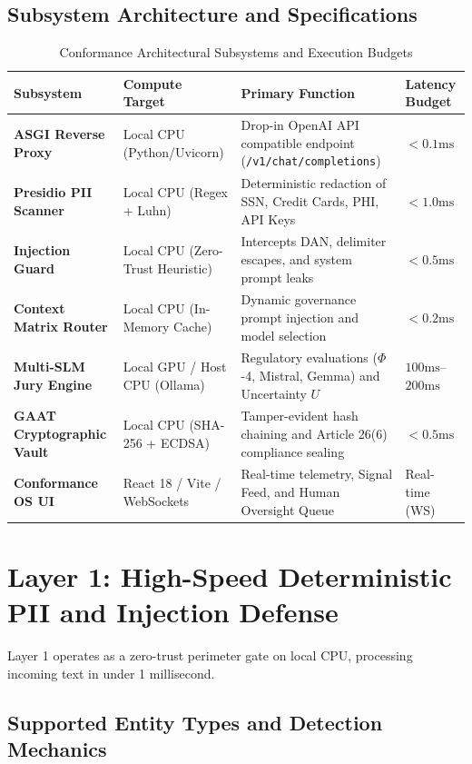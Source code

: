 \documentclass[11pt,a4paper]{article}
\begin{document}
\subsection{Subsystem Architecture and Specifications}

\begin{table}[h]
\caption{Conformance Architectural Subsystems and Execution Budgets}
\label{tab:subsystems}
\centering
\begin{tabularx}{\textwidth}{@{}llXl@{}}
\toprule
\textbf{Subsystem} & \textbf{Compute Target} & \textbf{Primary Function} & \textbf{Latency Budget} \\ \midrule
\textbf{ASGI Reverse Proxy} & Local CPU (Python/Uvicorn) & Drop-in OpenAI API compatible endpoint (\texttt{/v1/chat/completions}) & $<0.1\text{ms}$ \\
\textbf{Presidio PII Scanner} & Local CPU (Regex + Luhn) & Deterministic redaction of SSN, Credit Cards, PHI, API Keys & $<1.0\text{ms}$ \\
\textbf{Injection Guard} & Local CPU (Zero-Trust Heuristic) & Intercepts DAN, delimiter escapes, and system prompt leaks & $<0.5\text{ms}$ \\
\textbf{Context Matrix Router} & Local CPU (In-Memory Cache) & Dynamic governance prompt injection and model selection & $<0.2\text{ms}$ \\
\textbf{Multi-SLM Jury Engine} & Local GPU / Host CPU (Ollama) & Regulatory evaluations ($\Phi$-4, Mistral, Gemma) and Uncertainty $U$ & $100\text{ms}$--$200\text{ms}$ \\
\textbf{GAAT Cryptographic Vault} & Local CPU (SHA-256 + ECDSA) & Tamper-evident hash chaining and Article 26(6) compliance sealing & $<0.5\text{ms}$ \\
\textbf{Conformance OS UI} & React 18 / Vite / WebSockets & Real-time telemetry, Signal Feed, and Human Oversight Queue & Real-time (WS) \\ \bottomrule
\end{tabularx}
\end{table}

\section{Layer 1: High-Speed Deterministic PII and Injection Defense}
\label{sec:layer1}

Layer 1 operates as a zero-trust perimeter gate on local CPU, processing incoming text in under 1 millisecond.

\subsection{Supported Entity Types and Detection Mechanics}
\end{document}
